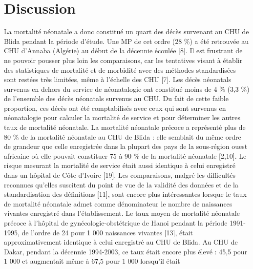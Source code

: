 \documentclass[
]{book}
\begin{document}
\hypertarget{discussion}{%
\chapter{Discussion}\label{discussion}}

La mortalité néonatale a donc constitué un quart des décès
survenant au CHU de Blida pendant la période d'étude. Une
MP de cet ordre (28 \%) a été retrouvée au CHU d'Annaba
(Algérie) au début de la décennie écoulée {[}8{]}. Il est frustrant
de ne pouvoir pousser plus loin les comparaisons, car les
tentatives visant à établir des statistiques de mortalité et de
morbidité avec des méthodes standardisées sont restées très
limitées, même à l'échelle des CHU {[}7{]}.
Les décès néonatals survenus en dehors du service de
néonatalogie ont constitué moins de 4 \% (3,3 \%) de
l'ensemble des décès néonatals survenus au CHU. Du fait
de cette faible proportion, ces décès ont été comptabilisés
avec ceux qui sont survenus en néonatalogie pour calculer
la mortalité de service et pour déterminer les autres taux de
mortalité néonatale.
La mortalité néonatale précoce a représenté plus de 80 \%
de la mortalité néonatale au CHU de Blida : elle semblait du
même ordre de grandeur que celle enregistrée dans la plupart
des pays de la sous-région ouest africaine où elle pouvait
constituer 75 à 90 \% de la mortalité néonatale {[}2,10{]}. Le
risque mesurant la mortalité de service était aussi identique à
celui enregistré dans un hôpital de Côte-d'Ivoire {[}19{]}.
Les comparaisons, malgré les difficultés reconnues
qu'elles suscitent du point de vue de la validité des données
et de la standardisation des définitions {[}11{]}, sont encore plus
intéressantes lorsque le taux de mortalité néonatale admet
comme dénominateur le nombre de naissances vivantes
enregistré dans l'établissement.
Le taux moyen de mortalité néonatale précoce à l'hôpital
de gynécologie-obstétrique de Hanoi pendant la période
1991-1995, de l'ordre de 24 pour 1 000 naissances vivantes
{[}13{]}, était approximativement identique à celui enregistré au
CHU de Blida. Au CHU de Dakar, pendant la décennie
1994-2003, ce taux était encore plus élevé : 45,5 pour
1 000 et augmentait même à 67,5 pour 1 000 lorsqu'il était
\end{document}
